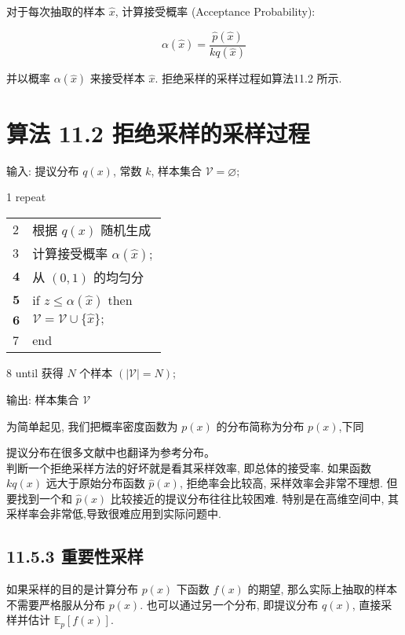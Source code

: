 \documentclass[10pt]{article}
\begin{document}
对于每次抽取的样本 $\hat{x}$, 计算接受概率 (Acceptance Probability):


\begin{equation*}
\alpha(\hat{x})=\frac{\hat{p}(\hat{x})}{k q(\hat{x})} \tag{11.98}
\end{equation*}


并以概率 $\alpha(\hat{x})$ 来接受样本 $\hat{x}$. 拒绝采样的采样过程如算法11.2 所示.

\section*{算法 11.2 拒绝采样的采样过程}
输入: 提议分布 $q(x)$, 常数 $k$, 样本集合 $\mathcal{V}=\varnothing$;

1 repeat

\begin{center}
\begin{tabular}{l|l}
2 & 根据 $q(x)$ 随机生成 \\
3 & 计算接受概率 $\alpha(\hat{x}) ;$ \\
$\mathbf{4}$ & 从 $(0,1)$ 的均匀分 \\
$\mathbf{5}$ & if $z \leq \alpha(\hat{x})$ then \\
$\mathbf{6}$ & $\mathcal{V}=\mathcal{V} \cup\{\hat{x}\} ;$ \\
7 & end \\
\end{tabular}
\end{center}

8 until 获得 $N$ 个样本 $(|\mathcal{V}|=N)$;

输出: 样本集合 $\mathcal{V}$

为简单起见, 我们把概率密度函数为 $p(x)$ 的分布简称为分布 $p(x)$,下同

提议分布在很多文献中也翻译为参考分布。\\
判断一个拒绝采样方法的好坏就是看其采样效率, 即总体的接受率. 如果函数 $k q(x)$ 远大于原始分布函数 $\hat{p}(x)$, 拒绝率会比较高, 采样效率会非常不理想. 但要找到一个和 $\hat{p}(x)$ 比较接近的提议分布往往比较困难. 特别是在高维空间中, 其采样率会非常低,导致很难应用到实际问题中.

\subsection*{11.5.3 重要性采样}
如果采样的目的是计算分布 $p(x)$ 下函数 $f(x)$ 的期望, 那么实际上抽取的样本不需要严格服从分布 $p(x)$. 也可以通过另一个分布, 即提议分布 $q(x)$, 直接采样并估计 $\mathbb{E}_{p}[f(x)]$.
\end{document}
